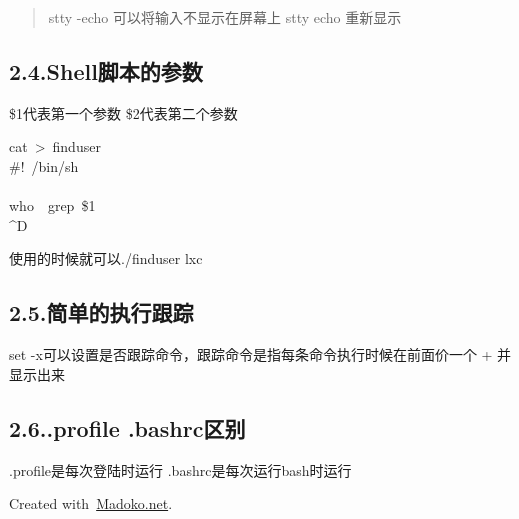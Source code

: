 \documentclass{article}
\begin{document}
\begin{quote}%

\noindent{}stty -echo\mdbr
{}可以将输入不显示在屏幕上\mdbr
{}stty echo\mdbr
{}重新显示 %
\end{quote}%

\subsection{2.4.\hspace*{0.5em}Shell脚本的参数}\label{sec-shell}%

\noindent{}\$1代表第一个参数
\$2代表第二个参数%
\begin{mdpre}%
\noindent{}cat~\textgreater{}~finduser\\
\#!~/bin/sh\\
\\
who~\textbar{}~grep~\$1\\
\textasciicircum{}D%
\end{mdpre}\noindent{}使用的时候就可以./finduser lxc

\subsection{2.5.\hspace*{0.5em}简单的执行跟踪}\label{section}%

\noindent{}set -x可以设置是否跟踪命令，跟踪命令是指每条命令执行时候在前面价一个 + 并显示出来%

\subsection{2.6.\hspace*{0.5em}.profile .bashrc区别}\label{sec-profile-bashrc}%

\noindent{}.profile是每次登陆时运行\mdbr
{}.bashrc是每次运行bash时运行%

\begin{mdbmargintb}{4em}{}%
\begin{mdflushright}%
{\tiny{}Created with~\href{https://www.madoko.net}{Madoko.net}.}%
\end{mdflushright}%
\end{mdbmargintb}%
\end{document}
